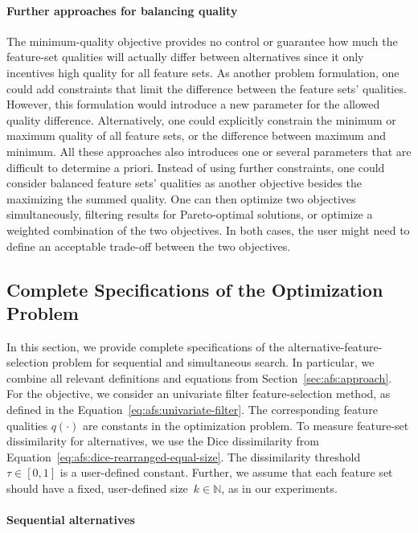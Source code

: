 \documentclass{article}
\theoremstyle{definition}
\begin{document}
\paragraph{Further approaches for balancing quality}

The minimum-quality objective provides no control or guarantee how much the feature-set qualities will actually differ between alternatives since it only incentives high quality for all feature sets.
As another problem formulation, one could add constraints that limit the difference between the feature sets' qualities.
However, this formulation would introduce a new parameter for the allowed quality difference.
Alternatively, one could explicitly constrain the minimum or maximum quality of all feature sets, or the difference between maximum and minimum.
All these approaches also introduces one or several parameters that are difficult to determine a priori.
Instead of using further constraints, one could consider balanced feature sets' qualities as another objective besides the maximizing the summed quality.
One can then optimize two objectives simultaneously, filtering results for Pareto-optimal solutions, or optimize a weighted combination of the two objectives.
In both cases, the user might need to define an acceptable trade-off between the two objectives.

\subsection{Complete Specifications of the Optimization Problem}
\label{sec:afs:appendix:complete-optimization-problem}

In this section, we provide complete specifications of the alternative-feature-selection problem for sequential and simultaneous search.
In particular, we combine all relevant definitions and equations from Section~\ref{sec:afs:approach}.
For the objective, we consider an univariate filter feature-selection method, as defined in the Equation~\ref{eq:afs:univariate-filter}.
The corresponding feature qualities $q(\cdot)$ are constants in the optimization problem.
To measure feature-set dissimilarity for alternatives, we use the Dice dissimilarity from Equation~\ref{eq:afs:dice-rearranged-equal-size}.
The dissimilarity threshold~$\tau \in [0,1]$ is a user-defined constant.
Further, we assume that each feature set should have a fixed, user-defined size~$k \in \mathbb{N}$, as in our experiments.

\paragraph{Sequential alternatives}
\end{document}
